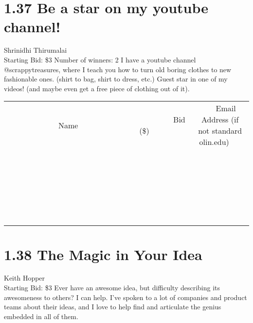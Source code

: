 \documentclass[11pt]{article}
\begin{document}
\section*{1.37 Be a star on my youtube channel!}
Shrinidhi Thirumalai
\\
Starting Bid: \$3
\newline
Number of winners: 2
\newline
I have a youtube channel @scrappytreasures, where I teach you how to turn old boring clothes to new fashionable ones. (shirt to bag, shirt to dress, etc.) Guest star in one of my videos! (and maybe even get a free piece of clothing out of it).
\\[6ex]
\begin{tabular}{c c c}
~~~~~~~~~~~~~Name~~~~~~~~~~~~~ & ~~~~~~~~~Bid (\$)~~~~~~~~~  & ~~~Email Address (if not standard olin.edu)~~~\\
 & & \\
\hline
 & & \\
\hline
 & & \\
\hline
 & & \\
\hline
 & & \\
\hline
 & & \\
\hline
 & & \\
\hline
 & & \\
\hline
 & & \\
\hline
 & & \\
\hline
 & & \\
\hline
 & & \\
\hline
 & & \\
\hline
 & & \\
\hline
 & & \\
\hline
 & & \\
\hline
 & & \\
\hline
 & & \\
\hline
 & & \\
\hline
 & & \\
\hline
 & & \\
\hline
 & & \\
\hline
 & & \\
\hline
 & & \\
\hline
 & & \\
\hline
 & & \\
\hline
\end{tabular}
\newpage
\section*{1.38 The Magic in Your Idea}
Keith Hopper
\\
Starting Bid: \$3
\newline
Ever have an awesome idea, but difficulty describing its awesomeness to others? I can help. I've spoken to a lot of companies and product teams about their ideas, and I love to help find and articulate the genius embedded in all of them.
\end{document}
